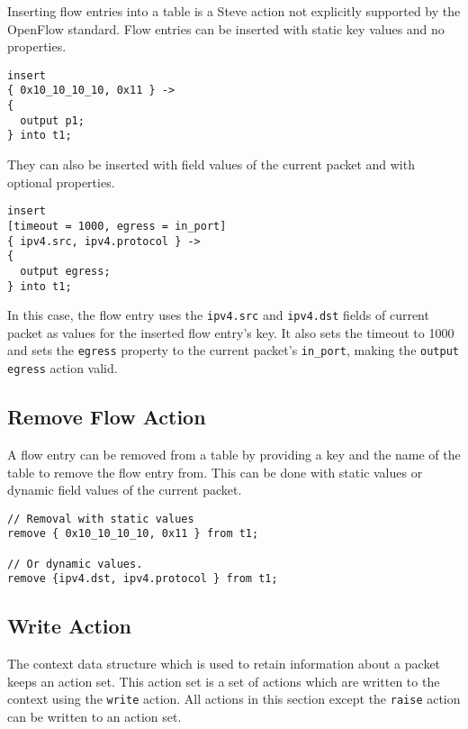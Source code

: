 Inserting flow entries into a table is a Steve action not explicitly supported by the OpenFlow standard. Flow entries can be inserted with static key values and no properties.

\begin{lstlisting}[float]
insert
{ 0x10_10_10_10, 0x11 } ->
{
  output p1;
} into t1;
\end{lstlisting}

They can also be inserted with field values of the current packet and with optional properties.

\begin{lstlisting}[float]
insert
[timeout = 1000, egress = in_port]
{ ipv4.src, ipv4.protocol } ->
{
  output egress;
} into t1;
\end{lstlisting}

In this case, the flow entry uses the \texttt{ipv4.src} and \texttt{ipv4.dst} fields of current packet as values for the inserted flow entry's key. It also sets the timeout to 1000 and sets the \texttt{egress} property to the current packet's \texttt{in_port}, making the \texttt{output egress} action valid.

\subsection{Remove Flow Action} \label{remove_flow_action_tut}

A flow entry can be removed from a table by providing a key and the name of the table to remove the flow entry from. This can be done with static values or dynamic field values of the current packet.

\begin{lstlisting}[float]
// Removal with static values
remove { 0x10_10_10_10, 0x11 } from t1;

// Or dynamic values.
remove {ipv4.dst, ipv4.protocol } from t1;
\end{lstlisting}

\subsection{Write Action} \label{write_action_tut}

The context data structure which is used to retain information about a packet keeps an action set. This action set is a set of actions which are written to the context using the \texttt{write} action. All actions in this section except the \texttt{raise} action can be written to an action set.

